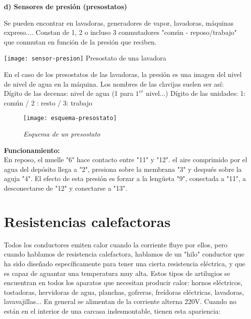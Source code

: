 \begin{center}
\textbf{d) Sensores de presión (presostatos)}
\end{center}
Se pueden encontrar en lavadoras, generadores de vapor, lavadoras, máquinas expreso.... Constan de 1, 2 o incluso 3 conmutadores "común - reposo/trabajo" que conmutan en función de la presión que reciben.

\noindent\begin{minipage}[t]{0.4\textwidth}\vspace{0pt}
\texttt{[image: sensor-presion]}
Presostato de una lavadora
\end{minipage}
\hfill%
\begin{minipage}[t]{0.5\textwidth}\vspace{\fill}
\vspace{\fill}
En el caso de los presostatos de las
lavadoras, la presión es una imagen del nivel de
nivel de agua en la máquina.
Los nombres de las clavijas suelen ser
así:
\\

Dígito de las decenas: nivel de agua (1 para
$1^{er}$ nivel...)
Dígito de las unidades: 1: común / 2 :
resto / 3: trabajo\\
\vspace{\fill}
\end{minipage}
\vspace{1em}

\begin{figure}[h]
\centering
\texttt{[image: esquema-presostato]}
\caption*{\textit{Esquema de un presostato}}
\end{figure}

\textbf{Funcionamiento:\\}
En reposo, el muelle "6" hace contacto entre "11" y "12".
el aire comprimido por el agua del depósito llega a "2", presiona sobre la membrana "3" y después sobre la aguja "4".
El efecto de esta presión es forzar a la lengüeta "9", conectada a "11", a 
desconectarse de "12" y conectarse a "13".

\newpage
\section{Resistencias calefactoras}

Todos los conductores emiten calor cuando la corriente fluye por ellos, pero cuando hablamos de resistencia calefactora, hablamos de un "hilo" conductor que ha sido diseñado específicamente para tener una cierta resistencia eléctrica, y que es capaz de aguantar una temperatura muy alta.
Estos tipos de artilugios se encuentran en todos los aparatos que necesitan producir calor: hornos eléctricos, tostadoras, hervidoras de agua, planchas, gofreras, freídoras eléctricas, lavadoras, lavavajillas...
En general se alimentan de la corriente alterna 220V. Cuando no están en el interior de una carcasa indesmontable, tienen esta apariencia:

